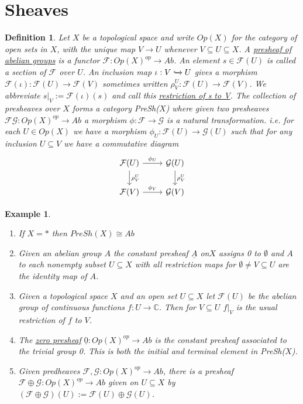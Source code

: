 \documentclass{book}
\newtheorem{definition}[theorem]{Definition}
\newtheorem{example}{Example}[section]
\begin{document}
\section{Sheaves} 
\begin{definition} 
Let $X$ be a topological space and write $Op(X)$ for the category of open sets in $X$, with the unique map $V\rightarrow U$ whenever $V\subseteq U\subseteq X$. A \underline{presheaf of abelian groups} is a functor $\mathcal{F}:Op(X)^{op} \rightarrow Ab$.  An element $s \in \mathcal{F}(U)$ is called a section of $\mathcal{F}$ over $U$.
An inclusion map $\iota : V \xhookrightarrow{} U$ gives a morphism $\mathcal{F}(\iota):\mathcal{F}(U) \rightarrow \mathcal{F}(V)$ sometimes written $\rho_V^U: \mathcal{F}(U) \rightarrow \mathcal{F}(V)$. We abbreviate $s|_V:=\mathcal{F}(\iota)(s)$ and call this \underline{restriction of s to V}. 
The collection of presheaves over $X$ forms a category PreSh($X$) where given two presheaves $\mathcal{F}\mathcal{G}:Op(X)^{op} \rightarrow Ab$ a morphism $\phi:\mathcal{F} \rightarrow \mathcal{G}$ is a natural transformation. i.e. for each $U\in Op(X)$ we have a morphism $\phi_U:\mathcal{F}(U) \rightarrow \mathcal{G}(U)$ such that for any inclusion $U\subseteq V$ we have a commutative diagram   $$\begin{tikzcd}
            \mathcal{F}(U) \arrow{r}{\phi_U} \arrow{d}{\rho_V^U}   & \mathcal{G}(U) \arrow{d}{\rho_V^U} \\
	\mathcal{F}(V) \arrow{r}{\phi_V} &  \mathcal{G}(V)
            \end{tikzcd}$$
\end{definition} 

\begin{example} 
\begin{enumerate}
\item If $X={*}$ then $PreSh(X) \cong Ab$
\item Given an abelian group $A$ the constant presheaf $\underline{A}$ on$X$ assigns 0 to $\emptyset$ and $A$ to each nonempty subset $U\subseteq X$ with all restriction maps for $\emptyset \neq V \subseteq U$ are the identity map of $A$.
\item Given a topological space $X$ and an open set $U\subseteq X$ let $\mathcal{F}(U)$ be the abelian group of continuous functions $f:U\rightarrow \mathbb{C}$. Then for $V\subseteq U$ $f|_V$ is the usual restriction of $f$ to $V$. 
\item The \underline{zero presheaf} $\underline{0}:Op(X)^{op}\rightarrow Ab$ is the constant presheaf associated to the trivial group 0. This is both the initial and terminal element in PreSh($X$).
\item Given predheaves $\mathcal{F},\mathcal{G}:Op(X)^{op} \rightarrow Ab$, there is a presheaf $\mathcal{F} \oplus \mathcal{G}:Op(X)^{op} \rightarrow Ab$ given on $U\subseteq X$ by $(\mathcal{F}\oplus \mathcal{G})(U):=\mathcal{F}(U) \oplus \mathcal{G}(U)$.
\end{enumerate}
\end{example} 
\end{document}
